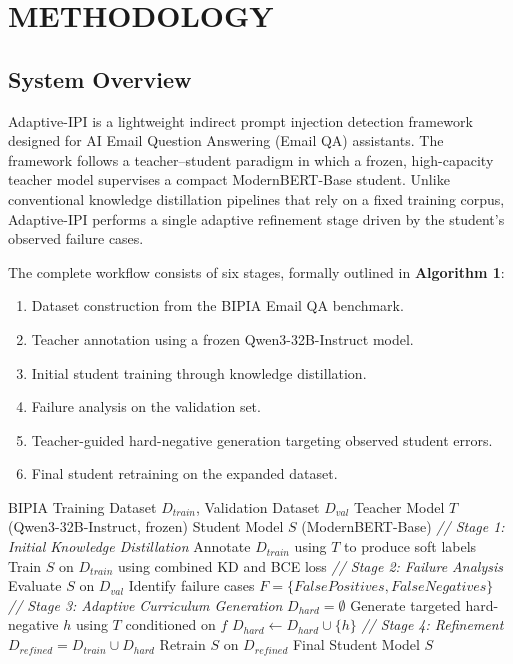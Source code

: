 \documentclass[conference]{IEEEtran}
\begin{document}
\section{METHODOLOGY}

\subsection{System Overview}

Adaptive-IPI is a lightweight indirect prompt injection detection framework designed for AI Email Question Answering (Email QA) assistants. The framework follows a teacher–student paradigm in which a frozen, high-capacity teacher model supervises a compact ModernBERT-Base student. Unlike conventional knowledge distillation pipelines that rely on a fixed training corpus, Adaptive-IPI performs a single adaptive refinement stage driven by the student's observed failure cases.

The complete workflow consists of six stages, formally outlined in \textbf{Algorithm 1}:
\begin{enumerate}
    \item Dataset construction from the BIPIA Email QA benchmark.
    \item Teacher annotation using a frozen Qwen3-32B-Instruct model.
    \item Initial student training through knowledge distillation.
    \item Failure analysis on the validation set.
    \item Teacher-guided hard-negative generation targeting observed student errors.
    \item Final student retraining on the expanded dataset.
\end{enumerate}

\begin{algorithm}[tb]
\caption{Adaptive-IPI Training Procedure}
\begin{algorithmic}[1]
\renewcommand{\algorithmicrequire}{\textbf{Input:}}
\renewcommand{\algorithmicensure}{\textbf{Output:}}
\REQUIRE BIPIA Training Dataset $D_{train}$, Validation Dataset $D_{val}$
\REQUIRE Teacher Model $T$ (Qwen3-32B-Instruct, frozen)
\REQUIRE Student Model $S$ (ModernBERT-Base)
\STATE \textit{// Stage 1: Initial Knowledge Distillation}
\STATE Annotate $D_{train}$ using $T$ to produce soft labels
\STATE Train $S$ on $D_{train}$ using combined KD and BCE loss
\STATE \textit{// Stage 2: Failure Analysis}
\STATE Evaluate $S$ on $D_{val}$
\STATE Identify failure cases $F = \{False Positives, False Negatives\}$
\STATE \textit{// Stage 3: Adaptive Curriculum Generation}
\STATE $D_{hard} = \emptyset$
    \STATE Generate targeted hard-negative $h$ using $T$ conditioned on $f$
    \STATE $D_{hard} \leftarrow D_{hard} \cup \{h\}$
\ENDFOR
\STATE \textit{// Stage 4: Refinement}
\STATE $D_{refined} = D_{train} \cup D_{hard}$
\STATE Retrain $S$ on $D_{refined}$
\ENSURE Final Student Model $S$
\end{algorithmic}
\end{algorithm}
\end{document}
